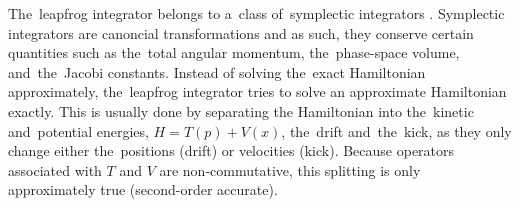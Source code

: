The~leapfrog integrator belongs to a~class of~symplectic integrators \parencite{2011EPJP..126...55D}. Symplectic integrators are canoncial transformations and as such, they conserve certain quantities such as the~total angular momentum, the~phase-space volume, and~the~Jacobi constants. Instead of solving the~exact Hamiltonian approximately, the~leapfrog integrator tries to solve an approximate Hamiltonian exactly. 
This is usually done by separating the Hamiltonian into the~kinetic and~potential energies, \({H=T(p)+V(x)}\), the~drift and~the~kick, as they only change either the~positions (drift) or velocities (kick). Because operators associated with $T$ and $V$ are non-commutative, this splitting is only approximately true (second-order accurate).
